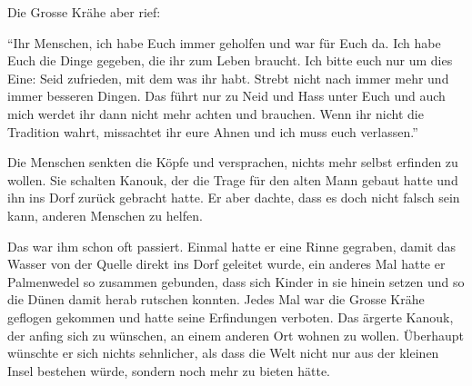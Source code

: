 Die Grosse Krähe aber rief: 

\enquote{Ihr Menschen, ich habe Euch immer geholfen und war für Euch da. Ich habe Euch die Dinge gegeben, die ihr zum Leben braucht. Ich bitte euch nur um dies Eine: Seid zufrieden, mit dem was ihr habt. Strebt nicht nach immer mehr und immer besseren Dingen. Das führt nur zu Neid und Hass unter Euch und auch mich werdet ihr dann nicht mehr achten und brauchen. Wenn ihr nicht die Tradition wahrt, missachtet ihr eure Ahnen und  ich muss euch verlassen.} 

Die Menschen senkten die Köpfe und versprachen, nichts mehr selbst erfinden zu wollen. Sie schalten Kanouk, der die Trage für den alten Mann gebaut hatte und ihn ins Dorf zurück gebracht hatte. Er aber dachte, dass es doch nicht falsch sein kann, anderen Menschen zu helfen.

Das war ihm schon oft passiert. Einmal hatte er eine Rinne gegraben, damit das Wasser von der Quelle direkt ins Dorf geleitet wurde, ein anderes Mal hatte er Palmenwedel so zusammen gebunden, dass sich Kinder in sie hinein setzen und so die Dünen damit herab rutschen konnten. Jedes Mal war die Grosse Krähe geflogen gekommen und hatte seine Erfindungen verboten. Das ärgerte Kanouk, der anfing sich zu wünschen, an einem anderen Ort wohnen zu wollen. Überhaupt wünschte er sich nichts sehnlicher, als dass die Welt nicht nur aus der kleinen Insel bestehen würde, sondern noch mehr zu bieten hätte.



